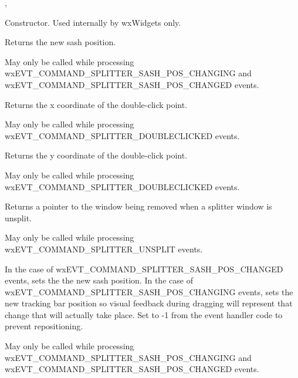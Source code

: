 
,\rtfsp
{}




\label{wxsplittereventconstr}


Constructor. Used internally by wxWidgets only.


\label{wxsplittereventgetsashposition}


Returns the new sash position.

May only be called while processing
wxEVT\_COMMAND\_SPLITTER\_SASH\_POS\_CHANGING and
wxEVT\_COMMAND\_SPLITTER\_SASH\_POS\_CHANGED events.


\label{wxsplittereventgetx}


Returns the x coordinate of the double-click point.

May only be called while processing
wxEVT\_COMMAND\_SPLITTER\_DOUBLECLICKED events.


\label{wxsplittereventgety}


Returns the y coordinate of the double-click point.

May only be called while processing
wxEVT\_COMMAND\_SPLITTER\_DOUBLECLICKED events.

\label{wxsplittereventgetwindowbeingremoved}


Returns a pointer to the window being removed when a splitter window
is unsplit.

May only be called while processing
wxEVT\_COMMAND\_SPLITTER\_UNSPLIT events.


\label{wxsplittereventsetsashposition}


In the case of wxEVT\_COMMAND\_SPLITTER\_SASH\_POS\_CHANGED events,
sets the the new sash position. In the case of
wxEVT\_COMMAND\_SPLITTER\_SASH\_POS\_CHANGING events, sets the new
tracking bar position so visual feedback during dragging will
represent that change that will actually take place. Set to -1 from
the event handler code to prevent repositioning.

May only be called while processing
wxEVT\_COMMAND\_SPLITTER\_SASH\_POS\_CHANGING and
wxEVT\_COMMAND\_SPLITTER\_SASH\_POS\_CHANGED events.



